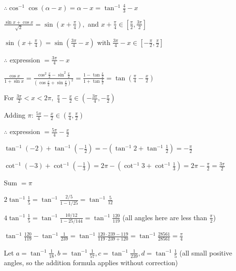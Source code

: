   $\therefore \cos^{-1}\cos(\alpha - x) = \alpha - x = \tan^{-1}\frac{4}{3} - x$

\item $\frac{\sin x + \cos x}{\sqrt{2}} = \sin\left(x + \frac{\pi}{4}\right),$ and $x + \frac{\pi}{4}\in\left[\frac{\pi}{2},
  \frac{3\pi}{2}\right]$

  $\sin\left(x + \frac{\pi}{4}\right) = \sin\left(\frac{3\pi}{4} - x\right)$ with $\frac{3\pi}{4} - x\in\left[-\frac{\pi}{2},
  \frac{\pi}{2}\right]$

  $\therefore$ expression $= \frac{3\pi}{4} - x$

\item $\frac{\cos x}{1 + \sin x} = \frac{\cos^2\frac{x}{2} - \sin^2\frac{x}{2}}{\left(\cos\frac{x}{2} + \sin\frac{x}{2}\right)^2} =
  \frac{1 - \tan\frac{x}{2}}{1 + \tan\frac{x}{2}} = \tan\left(\frac{\pi}{4} - \frac{x}{2}\right)$

  For $\frac{3\pi}{2} < x < 2\pi,$ $\frac{\pi}{4} - \frac{x}{2}\in\left(-\frac{3\pi}{4}, -\frac{\pi}{2}\right)$

  Adding $\pi$: $\frac{5\pi}{4} - \frac{x}{2}\in\left(\frac{\pi}{4}, \frac{\pi}{2}\right)$

  $\therefore$ expression $= \frac{5\pi}{4} - \frac{x}{2}$

\item $\tan^{-1}(-2) + \tan^{-1}\left(-\frac{1}{2}\right) = -\left(\tan^{-1}2 + \tan^{-1}\frac{1}{2}\right) = -\frac{\pi}{2}$

  $\cot^{-1}(-3) + \cot^{-1}\left(-\frac{1}{3}\right) = 2\pi - \left(\cot^{-1}3 + \cot^{-1}\frac{1}{3}\right) = 2\pi -
  \frac{\pi}{2} = \frac{3\pi}{2}$

  Sum $= \pi$

\item $2\tan^{-1}\frac{1}{5} = \tan^{-1}\frac{2/5}{1 - 1/25} = \tan^{-1}\frac{5}{12}$

  $4\tan^{-1}\frac{1}{5} = \tan^{-1}\frac{10/12}{1 - 25/144} = \tan^{-1}\frac{120}{119}$ (all angles here are less than
  $\frac{\pi}{2}$)

  $\tan^{-1}\frac{120}{119} - \tan^{-1}\frac{1}{239} = \tan^{-1}\frac{120\cdot239 - 119}{119\cdot239 + 120} =
  \tan^{-1}\frac{28561}{28561} = \frac{\pi}{4}$

\item Let $a = \tan^{-1}\frac{1}{18}, b = \tan^{-1}\frac{1}{57}, c = \tan^{-1}\frac{1}{239}, d = \tan^{-1}\frac{1}{5}$ (all
  small positive angles, so the addition formula applies without correction)


